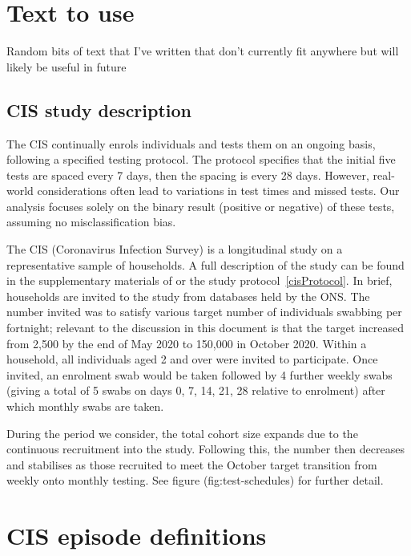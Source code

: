 \documentclass[a4paper,12pt,custombib,times]{PhDThesisPSnPDF} %
\begin{document}




\appendix

\chapter{Text to use}

Random bits of text that I've written that don't currently fit anywhere but will likely be useful in future

\section{CIS study description}
The CIS continually enrols individuals and tests them on an ongoing basis, following a
specified testing protocol. The protocol specifies that the initial five
tests are spaced every 7 days, then the spacing is every 28 days.
However, real-world considerations often lead to variations in test
times and missed tests. Our analysis focuses solely on the binary result
(positive or negative) of these tests, assuming no misclassification
bias.

The CIS (Coronavirus Infection Survey) is a longitudinal study on a representative sample of households.
A full description of the study can be found in the supplementary materials of \textcite{pouwelsCommunity} or the study protocol~\autoref{cisProtocol}.
In brief, households are invited to the study from databases held by the ONS.
The number invited was to satisfy various target number of individuals swabbing per fortnight; relevant to the discussion in this document is that the target increased from 2,500 by the end of May 2020 to 150,000 in October 2020.
Within a household, all individuals aged 2 and over were invited to participate.
Once invited, an enrolment swab would be taken followed by 4 further weekly swabs (giving a total of 5 swabs on days 0, 7, 14, 21, 28 relative to enrolment) after which monthly swabs are taken.

During the period we consider, the total cohort size expands due to the continuous recruitment into the study.
Following this, the number then decreases and stabilises as those recruited to meet the October target transition from weekly onto monthly testing.
See figure \@ref(fig:test-schedules) for further detail.


\chapter{CIS episode definitions} \label{episode-def}

\end{document}
